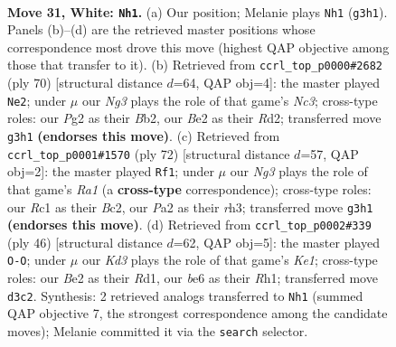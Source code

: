 \documentclass[11pt]{article}
\begin{document}
\clearpage

\begin{figure}[p]\centering
\begin{subfigure}{0.46\textwidth}\centering
\resizebox{\linewidth}{!}{%
\newchessgame
\chessboard[
  setfen={r4kr1/1p3p1p/4b1p1/p2p4/5P2/3K2N1/PP2B1PP/2R3R1 w - - 3 31},
  showmover=false,
  pgfstyle=straightmove, color=movearrow, markmove={g3-h1}
]}
\caption{}
\end{subfigure}\hfill
\begin{subfigure}{0.46\textwidth}\centering
\resizebox{\linewidth}{!}{%
\newchessgame
\chessboard[
  setfen={6kr/pp2r1p1/2p4p/7P/PP4P1/2N5/1B1R2K1/8 w - - 2 36},
  showmover=false,
  pgfstyle=straightmove, color=movearrow, markmove={c3-e2}
]}
\caption{}
\end{subfigure}
\\[4pt]
\begin{subfigure}{0.46\textwidth}\centering
\resizebox{\linewidth}{!}{%
\newchessgame
\chessboard[
  setfen={3r2k1/3n1pp1/p6p/Pp1Pp3/2p1N1P1/7r/1KB3R1/R7 w - - 2 37},
  showmover=false,
  pgfstyle=straightmove, color=movearrow, markmove={a1-f1}
]}
\caption{}
\end{subfigure}\hfill
\begin{subfigure}{0.46\textwidth}\centering
\resizebox{\linewidth}{!}{%
\newchessgame
\chessboard[
  setfen={2b2rk1/1p3p1p/5Bp1/8/1pr5/4P3/P4PPP/3RK2R w K - 0 24},
  showmover=false,
  pgfstyle=straightmove, color=movearrow, markmove={e1-g1}
]}
\caption{}
\end{subfigure}
\caption{\textbf{Move 31, White: \texttt{Nh1}.} (a) Our position; Melanie plays \texttt{Nh1} (\texttt{g3h1}). Panels (b)--(d) are the retrieved master positions whose correspondence most drove this move (highest QAP objective among those that transfer to it). (b) Retrieved from \texttt{ccrl\_top\_p0000\#2682} (ply 70) [structural distance $d$=64, QAP obj=4]: the master played \texttt{Ne2}; under $\mu$ our \emph{Ng3} plays the role of that game's \emph{Nc3}; cross-type roles: our \emph{P}g2 as their \emph{B}b2, our \emph{B}e2 as their \emph{R}d2; transferred move \texttt{g3h1} \textbf{(endorses this move)}. (c) Retrieved from \texttt{ccrl\_top\_p0001\#1570} (ply 72) [structural distance $d$=57, QAP obj=2]: the master played \texttt{Rf1}; under $\mu$ our \emph{Ng3} plays the role of that game's \emph{Ra1} (a \textbf{cross-type} correspondence); cross-type roles: our \emph{R}c1 as their \emph{B}c2, our \emph{P}a2 as their \emph{r}h3; transferred move \texttt{g3h1} \textbf{(endorses this move)}. (d) Retrieved from \texttt{ccrl\_top\_p0002\#339} (ply 46) [structural distance $d$=62, QAP obj=5]: the master played \texttt{O-O}; under $\mu$ our \emph{Kd3} plays the role of that game's \emph{Ke1}; cross-type roles: our \emph{B}e2 as their \emph{R}d1, our \emph{b}e6 as their \emph{R}h1; transferred move \texttt{d3c2}. Synthesis: 2 retrieved analogs transferred to \texttt{Nh1} (summed QAP objective 7, the strongest correspondence among the candidate moves); Melanie committed it via the \texttt{search} selector.}
\label{fig:thought-m60}
\end{figure}
\end{document}
